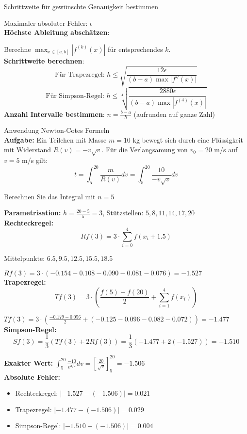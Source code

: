 \begin{KR}{Schrittweite für gewünschte Genauigkeit bestimmen}

Maximaler absoluter Fehler: $\epsilon$
\vspace{1mm}\\
\textbf{Höchste Ableitung abschätzen}:

Berechne $\max_{x \in [a,b]} |f^{(k)}(x)|$ für entsprechendes $k$.
\vspace{1mm}\\
\textbf{Schrittweite berechnen}:
\vspace{-3mm}\\
$$\text{Für Trapezregel: } h \leq \sqrt{\frac{12\epsilon}{(b-a) \max |f''(x)|}}$$
\vspace{-2mm}
$$\text{Für Simpson-Regel: } h \leq \sqrt[4]{\frac{2880\epsilon}{(b-a) \max |f^{(4)}(x)|}}$$
\textbf{Anzahl Intervalle bestimmen}:
$n = \frac{b-a}{h}$ (aufrunden auf ganze Zahl)
\end{KR}

\begin{example2}{Anwendung Newton-Cotes Formeln}\\
\textbf{Aufgabe:} Ein Teilchen mit Masse $m = 10$ kg bewegt sich durch eine Flüssigkeit mit Widerstand $R(v) = -v\sqrt{v}$. Für die Verlangsamung von $v_0 = 20$ m/s auf $v = 5$ m/s gilt:
$$t = \int_5^{20} \frac{m}{R(v)} dv = \int_5^{20} \frac{10}{-v\sqrt{v}} dv$$

Berechnen Sie das Integral mit $n = 5$
\tcblower

\textbf{Parametrisation:} $h = \frac{20-5}{5} = 3$, Stützstellen: $5, 8, 11, 14, 17, 20$
\vspace{1mm}\\
\textbf{Rechteckregel:} $$Rf(3) = 3 \cdot \sum_{i=0}^{4} f(x_i + 1.5)$$

Mittelpunkte: $6.5, 9.5, 12.5, 15.5, 18.5$

$Rf(3) = 3 \cdot (-0.154 - 0.108 - 0.090 - 0.081 - 0.076) = -1.527$
\vspace{2mm}\\
\textbf{Trapezregel:} $$Tf(3) = 3 \cdot (\frac{f(5) + f(20)}{2} + \sum_{i=1}^{4} f(x_i))$$

$Tf(3) = 3 \cdot (\frac{-0.179 - 0.056}{2} + (-0.125 - 0.096 - 0.082 - 0.072)) = -1.477$
\vspace{1mm}\\
\textbf{Simpson-Regel:} $$Sf(3) = \frac{1}{3}(Tf(3) + 2Rf(3)) = \frac{1}{3}(-1.477 + 2(-1.527)) = -1.510$$

\textbf{Exakter Wert:} $\int_5^{20} \frac{-10}{v^{3/2}} dv = \left[\frac{20}{\sqrt{v}}\right]_5^{20} = -1.506$
\vspace{2mm}\\
\textbf{Absolute Fehler:}
\begin{itemize}
    \item Rechteckregel: $|{-1.527} - ({-1.506})| = 0.021$
    \item Trapezregel: $|{-1.477} - ({-1.506})| = 0.029$  
    \item Simpson-Regel: $|{-1.510} - ({-1.506})| = 0.004$
\end{itemize}
\end{example2}


